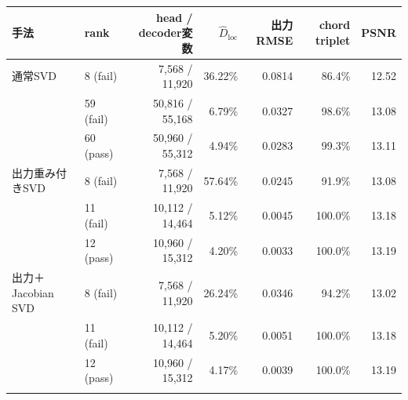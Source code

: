 \begin{tabular}{llrrrrr}
\toprule
手法 & rank & head / decoder変数 & $\widehat D_{\mathrm{loc}}$ & 出力RMSE & chord triplet & PSNR \\
\midrule
通常SVD & 8 (fail) & 7,568 / 11,920 & 36.22\% & 0.0814 & 86.4\% & 12.52 \\
 & 59 (fail) & 50,816 / 55,168 & 6.79\% & 0.0327 & 98.6\% & 13.08 \\
 & 60 (pass) & 50,960 / 55,312 & 4.94\% & 0.0283 & 99.3\% & 13.11 \\
\addlinespace
出力重み付きSVD & 8 (fail) & 7,568 / 11,920 & 57.64\% & 0.0245 & 91.9\% & 13.08 \\
 & 11 (fail) & 10,112 / 14,464 & 5.12\% & 0.0045 & 100.0\% & 13.18 \\
 & 12 (pass) & 10,960 / 15,312 & 4.20\% & 0.0033 & 100.0\% & 13.19 \\
\addlinespace
出力＋Jacobian SVD & 8 (fail) & 7,568 / 11,920 & 26.24\% & 0.0346 & 94.2\% & 13.02 \\
 & 11 (fail) & 10,112 / 14,464 & 5.20\% & 0.0051 & 100.0\% & 13.18 \\
 & 12 (pass) & 10,960 / 15,312 & 4.17\% & 0.0039 & 100.0\% & 13.19 \\
\addlinespace
\bottomrule
\end{tabular}

